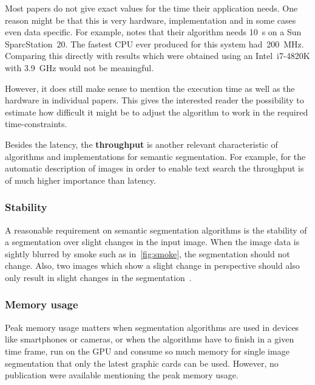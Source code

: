 Most papers do not give exact values for the time their application needs. One
reason might be that this is very hardware, implementation and in some cases
even data specific. For example, \cite{hoover1996experimental} notes that their
algorithm needs \SI{10}{\second} on a Sun SparcStation~20. The fastest CPU ever
produced for this system had~\SI{200}{\mega\hertz}. Comparing this directly
with results which were obtained using an Intel~i7-4820K with
\SI{3.9}{\giga\hertz} would not be meaningful.

However, it does still make sense to mention the execution time as well as the
hardware in individual papers. This gives the interested reader the possibility
to estimate how difficult it might be to adjust the algorithm to work in the
required time-constraints.

Besides the latency, the \textbf{throughput} is another relevant characteristic
of algorithms and implementations for semantic segmentation. For example, for
the automatic description of images in order to enable text search the
throughput is of much higher importance than latency.


\subsubsection{Stability}%
\label{subsubsec:stability-quality-measure}%
A reasonable requirement on semantic segmentation algorithms is the stability
of a segmentation over slight changes in the input image. When the image data
is sightly blurred by smoke such as in~\cref{fig:smoke}, the segmentation
should not change. Also, two images which show a slight change in perspective
should also only result in slight changes in the
segmentation~\cite{pantofaru2005comparison}.


\subsubsection{Memory usage}
Peak memory usage matters when segmentation algorithms are used in devices like
smartphones or cameras, or when the algorithms have to finish in a given time
frame, run on the \gls{GPU} and consume so much memory for single image
segmentation that only the latest graphic cards can be used. However, no
publication were available mentioning the peak memory usage.
